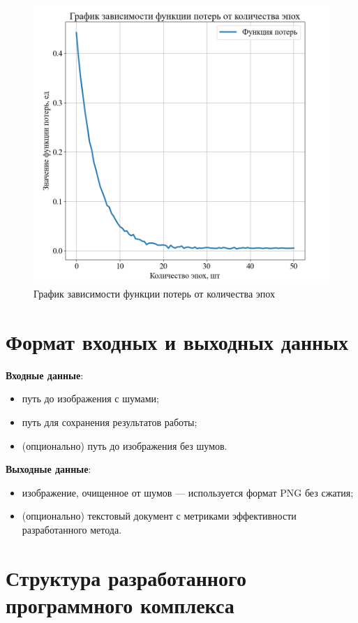 \begin{figure}[h!btp]
	\centering
	\includegraphics[scale=0.65]{inc/implementation/loss_graph.png}
	\caption{График зависимости функции потерь от количества эпох}
	\label{fig:loss_graph}	
\end{figure}

\section{Формат входных и выходных данных}

\textbf{Входные данные}:
\begin{itemize}
    \item путь до изображения с шумами;
    \item путь для сохранения результатов работы;
    \item (опционально) путь до изображения без шумов.
\end{itemize}

\textbf{Выходные данные}:
\begin{itemize}
    \item изображение, очищенное от шумов --- используется формат PNG без сжатия;
    \item (опционально) текстовый документ с метриками эффективности разработанного метода.
\end{itemize}

\section{Структура разработанного программного комплекса}

